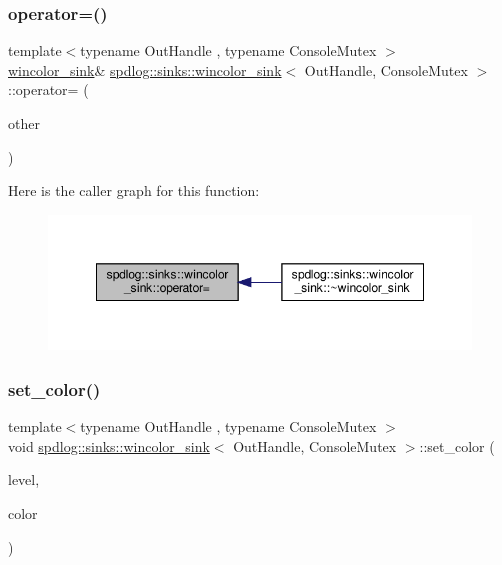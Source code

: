 \subsubsection{\texorpdfstring{operator=()}{operator=()}}
{\footnotesize\ttfamily template$<$typename Out\+Handle , typename Console\+Mutex $>$ \\
\hyperlink{classspdlog_1_1sinks_1_1wincolor__sink}{wincolor\+\_\+sink}\& \hyperlink{classspdlog_1_1sinks_1_1wincolor__sink}{spdlog\+::sinks\+::wincolor\+\_\+sink}$<$ Out\+Handle, Console\+Mutex $>$\+::operator= (\begin{DoxyParamCaption}\item[{const \hyperlink{classspdlog_1_1sinks_1_1wincolor__sink}{wincolor\+\_\+sink}$<$ Out\+Handle, Console\+Mutex $>$ \&}]{other }\end{DoxyParamCaption})\hspace{0.3cm}{\ttfamily [delete]}}

Here is the caller graph for this function\+:
\nopagebreak
\begin{figure}[H]
\begin{center}
\leavevmode
\includegraphics[width=348pt]{classspdlog_1_1sinks_1_1wincolor__sink_a54ca784b8f5e1ee9c2adcda3125c3515_icgraph}
\end{center}
\end{figure}
\mbox{\label{classspdlog_1_1sinks_1_1wincolor__sink_a914a0d9aed02627be8cd287a2dee9916}} 
\subsubsection{\texorpdfstring{set\+\_\+color()}{set\_color()}}
{\footnotesize\ttfamily template$<$typename Out\+Handle , typename Console\+Mutex $>$ \\
void \hyperlink{classspdlog_1_1sinks_1_1wincolor__sink}{spdlog\+::sinks\+::wincolor\+\_\+sink}$<$ Out\+Handle, Console\+Mutex $>$\+::set\+\_\+color (\begin{DoxyParamCaption}\item[{\hyperlink{namespacespdlog_1_1level_a35f5227e5daf228d28a207b7b2aefc8b}{level\+::level\+\_\+enum}}]{level,  }\item[{W\+O\+RD}]{color }\end{DoxyParamCaption})\hspace{0.3cm}{\ttfamily [inline]}}



